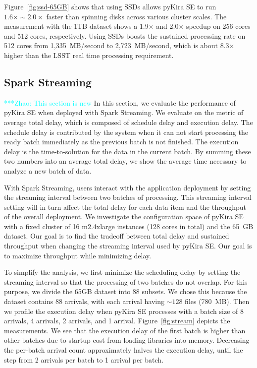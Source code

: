\documentclass[10pt,journal,compsoc]{IEEEtran}
\newcommand{\zhaonote}[1]{{\textcolor{cyan}    { ***Zhao:      #1 }}}
\newcommand{\zhaonote}[1]{}
\begin{document}
Figure~\ref{fig:ssd-65GB} shows that using SSDs allows pyKira SE to run $1.6\times\sim2.0\times$ faster than spinning disks across various cluster scales.
The measurement with the 1TB dataset  shows a 1.9$\times$ and 2.0$\times$ speedup on 256 cores and 512 cores, respectively.
Using SSDs boosts the sustained processing rate on 512 cores from 1,335~MB/second to 2,723~MB/second, which is about 8.3$\times$ higher
than the LSST real time processing requirement.

\subsection{Spark Streaming}
\zhaonote{This section is new}
In this section, we evaluate the performance of pyKira SE when deployed with Spark Streaming. We evaluate on the metric of average total delay,
which is composed of schedule delay and execution delay.
The schedule delay is contributed by the system when it can not start processing the ready batch immediately as the previous batch is not finished.
The execution delay is the time-to-solution for the data in the current batch.
By summing these two numbers into an average total delay, we show the average time necessary to analyze a new batch of data.

With Spark Streaming, users interact with the application deployment by setting the streaming interval between two batches of processing.
This streaming interval setting will in turn affect the total delay for each data item and the throughput of the overall deployment.
We investigate the configuration space of pyKira SE with a fixed cluster of 16 m2.4xlarge instances (128 cores in total) and 
the 65~GB dataset. 
Our goal is to find the tradeoff between total delay and sustained throughput when changing the streaming interval used by pyKira SE. Our goal is to
maximize throughput while minimizing delay.

To simplify the analysis, we first minimize the scheduling delay by setting the streaming interval so that the processing of two batches
do not overlap.
For this purpose, we divide the 65GB dataset into 88 subsets. We chose this because the dataset contains 88 arrivals, 
with each arrival having $\sim128$ files (780~MB).
Then we profile the execution delay when pyKira SE processes with a batch size of 8 arrivals, 4 arrivals, 2 arrivals, and 1 arrival.
Figure~\ref{fig:stream} depicts the measurements.
We see that the execution delay of the first batch is higher than other batches due to startup cost from loading libraries into memory.
Decreasing the per-batch arrival count approximately halves the execution delay, until the step from 2 arrivals per batch to 1 arrival per batch.
\end{document}
